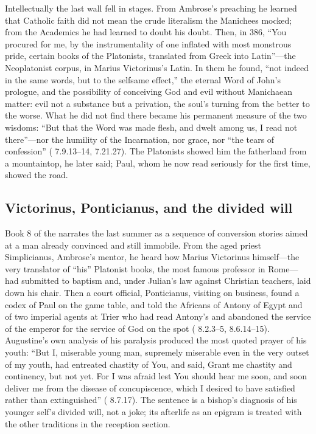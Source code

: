 Intellectually the last wall fell in stages. From Ambrose's preaching he
learned that Catholic faith did not mean the crude literalism the Manichees
mocked; from the Academics he had learned to doubt his doubt. Then, in 386,
``You procured for me, by the instrumentality of one inflated with most
monstrous pride, certain books of the Platonists, translated from Greek into
Latin''---the Neoplatonist corpus, in Marius Victorinus's Latin. In them he
found, ``not indeed in the same words, but to the selfsame effect,'' the
eternal Word of John's prologue, and the possibility of conceiving God and
evil without Manichaean matter: evil not a substance but a privation, the
soul's turning from the better to the worse. What he did not find there
became his permanent measure of the two wisdoms: ``But that the Word was made
flesh, and dwelt among us, I read not there''---nor the humility of the
Incarnation, nor grace, nor ``the tears of confession''
( 7.9.13--14, 7.21.27). The Platonists showed him the
fatherland from a mountaintop, he later said; Paul, whom he now read
seriously for the first time, showed the road.

\subsection{Victorinus, Ponticianus, and the divided will}

Book 8 of the  narrates the last summer as a sequence of
conversion stories aimed at a man already convinced and still immobile. From
the aged priest Simplicianus, Ambrose's mentor, he heard how Marius
Victorinus himself---the very translator of ``his'' Platonist books, the most
famous professor in Rome---had submitted to baptism and, under Julian's law
against Christian teachers, laid down his chair. Then a court official,
Ponticianus, visiting on business, found a codex of Paul on the game table,
and told the Africans of Antony of Egypt and of two imperial agents at Trier
who had read Antony's  and abandoned the service of the emperor
for the service of God on the spot ( 8.2.3--5,
8.6.14--15). Augustine's own analysis of his paralysis produced the most
quoted prayer of his youth: ``But I, miserable young man, supremely
miserable even in the very outset of my youth, had entreated chastity of
You, and said, Grant me chastity and continency, but not yet. For I was
afraid lest You should hear me soon, and soon deliver me from the disease of
concupiscence, which I desired to have satisfied rather than extinguished''
( 8.7.17). The sentence is a bishop's diagnosis of his younger self's divided
will, not a joke; its afterlife as an epigram is treated with the other
traditions in the reception section.

